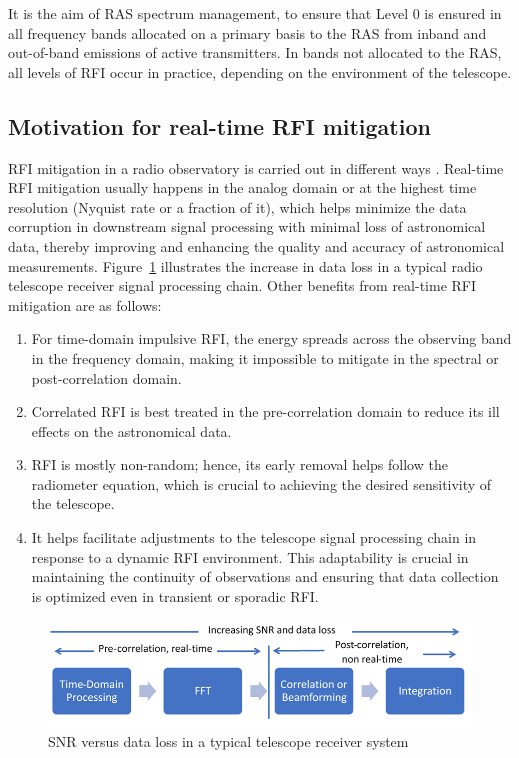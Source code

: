 It is the aim of RAS spectrum management, to ensure that Level 0 is ensured in all frequency bands allocated on a primary basis to the RAS from inband and out-of-band emissions of active transmitters. In bands not allocated to the RAS, all levels of RFI occur in practice, depending on the environment of the telescope. 


\subsection{Motivation for real-time RFI mitigation}
\label{subsection:hardware:introduction: motivations}

RFI mitigation in a radio observatory is carried out in different ways \cite{ford2014rfi}. Real-time RFI mitigation usually happens in the analog domain or at the highest time resolution (Nyquist rate or a fraction of it), which helps minimize the data corruption in downstream signal processing with minimal loss of astronomical data, thereby improving and enhancing the quality and accuracy of astronomical measurements. Figure~\ref{fig:real-time-rfi} illustrates the increase in data loss in a typical radio telescope receiver signal processing chain.
Other benefits from real-time RFI mitigation are as follows:

\begin{enumerate}
\item For time-domain impulsive RFI, the energy spreads across the observing band in the frequency domain, making it impossible to mitigate in the spectral or post-correlation domain.

\item Correlated RFI is best treated in the pre-correlation domain to reduce its ill effects on the astronomical data.

\item RFI is mostly non-random; hence, its early removal helps follow the radiometer equation, which is crucial to achieving the desired sensitivity of the telescope.

\item It helps facilitate adjustments to the telescope signal processing chain in response to a dynamic RFI environment. This adaptability is crucial in maintaining the continuity of observations and ensuring that data collection is optimized even in transient or sporadic RFI.
\end{enumerate}

\begin{figure}
    \centering
    \includegraphics[scale=0.8]{Hardware Excision Techniques/figures/rt.jpg}
    \caption{SNR versus data loss in a typical telescope receiver system}
    \label{fig:real-time-rfi}
\end{figure}


